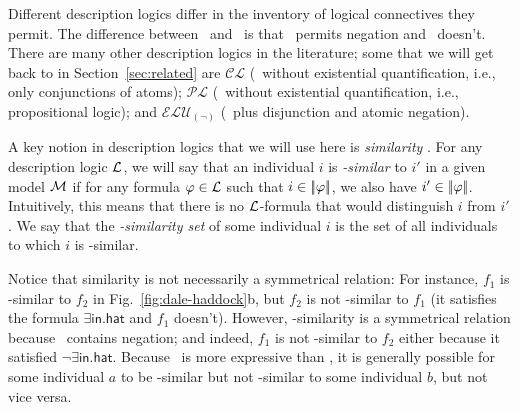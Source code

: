 Different description logics differ in the inventory of logical
connectives they permit.  The difference between \alc\ and \el\ is
that \alc\ permits negation and \el\ doesn't.  There are many other
description logics in the literature; some that we will get back to in
Section~\ref{sec:related} are $\mathcal{CL}$ (\el\ without existential
quantification, i.e., only conjunctions of atoms); $\mathcal{PL}$
(\alc\ without existential quantification, i.e., propositional logic);
and $\mathcal{ELU}_{(\neg)}$ (\el\ plus disjunction and atomic
negation).

A key notion in description logics that we will use here is
\emph{similarity} .  For any description logic $\mathcal{L}$,
we will say that an individual $i$ is \emph{\gL-similar} to $i'$ in a
given model $\mathcal{M}$ if for any formula $\varphi \in \mathcal{L}$ such that $i
\in |\!|\varphi|\!|$, we also have $i' \in |\!|\varphi|\!|$.
Intuitively, this means that there is no $\mathcal{L}$-formula that would
distinguish $i$ from $i'$.  We say that the \emph{\gL-similarity set}
of some individual $i$ is the set of all individuals to which $i$ is
\gL-similar.

Notice that similarity is not necessarily a symmetrical relation: For
instance, $f_1$ is \el-similar to $f_2$ in
Fig.~\ref{fig:dale-haddock}b, but $f_2$ is not \el-similar to $f_1$
(it satisfies the formula $\exists \mathsf{in}.\mathsf{hat}$ and $f_1$
doesn't).  However, \alc-similarity is a symmetrical relation because
\alc\ contains negation; and indeed, $f_1$ is not \alc-similar to
$f_2$ either because it satisfied $\neg \exists
\mathsf{in}.\mathsf{hat}$.  Because \alc\ is more expressive than \el,
it is generally possible for some individual $a$ to be \el-similar but
not \alc-similar to some individual $b$, but not vice versa.


